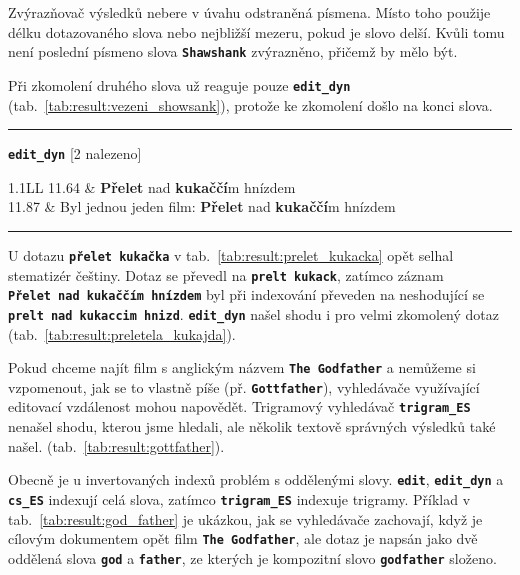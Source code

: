 \documentclass[11pt,letterpaper,oneside,openright]{book}
\newcommand{\bftt}[1]{\texttt{\textbf{#1}}}
\newcommand{\boldred}[1]{\textbf{\color{red} #1}}
\newcommand{\horizlina}%
{
    \mbox{}\vspace{1em}
    \hrule
    \mbox{}
}
\begin{document}
Zvýrazňovač výsledků nebere v úvahu odstraněná písmena. Místo toho použije
délku dotazovaného slova nebo nejbližší mezeru, pokud je slovo delší. Kvůli
tomu není poslední písmeno slova \bftt{Shawshank} zvýrazněno, přičemž by mělo
být.

\mbox{}\mbox{}

Při zkomolení druhého slova už reaguje pouze \bftt{edit\_dyn}
(tab.~\ref{tab:result:vezeni_showsank}), protože ke zkomolení došlo na
konci slova.

\mbox{}\mbox{}

\begin{table}[H]
\begin{tt}
\horizlina

\bftt{edit\_dyn} [2 nalezeno]\vspace{5pt}

\begin{tabulary}{1.1\textwidth}{LL}
11.64 & \boldred{Přelet} nad \boldred{kukaččí}m hnízdem \\
11.87 & Byl jednou jeden film: \boldred{Přelet} nad \boldred{kukaččí}m hnízdem \\
\end{tabulary}
\horizlina

\end{tt}
\caption{Výsledek dotazu \bftt{Přeletěla kukajda}}
\label{tab:result:preletela_kukajda}
\end{table}

U dotazu \bftt{přelet~kukačka} v tab.~\ref{tab:result:prelet_kukacka} opět
selhal stematizér češtiny. Dotaz se převedl na \bftt{prelt~kukack}, zatímco
záznam \bftt{Přelet~nad~kukaččím~hnízdem} byl při indexování převeden na
neshodující se \bftt{prelt~nad~kukaccim~hnizd}. \bftt{edit\_dyn} našel shodu i
pro velmi zkomolený dotaz (tab.~\ref{tab:result:preletela_kukajda}).

\mbox{}\mbox{}

Pokud chceme najít film s anglickým názvem \bftt{The Godfather} a nemůžeme si
vzpomenout, jak se to vlastně píše (př. \bftt{Gottfather}), vyhledávače
využívající editovací vzdálenost mohou napovědět. Trigramový vyhledávač
\bftt{trigram\_ES} nenašel shodu, kterou jsme hledali, ale několik textově
správných výsledků také našel.  (tab.~\ref{tab:result:gottfather}).

\mbox{}\mbox{}

Obecně je u invertovaných indexů problém s oddělenými slovy. \bftt{edit},
\bftt{edit\_dyn} a \bftt{cs\_ES} indexují celá slova, zatímco
\bftt{trigram\_ES} indexuje trigramy. Příklad v
tab.~\ref{tab:result:god_father} je ukázkou, jak se vyhledávače zachovají, když
je cílovým dokumentem opět film \bftt{The Godfather}, ale dotaz je napsán jako
dvě oddělená slova \bftt{god} a \bftt{father}, ze kterých je kompozitní slovo
\bftt{godfather} složeno.
\end{document}
